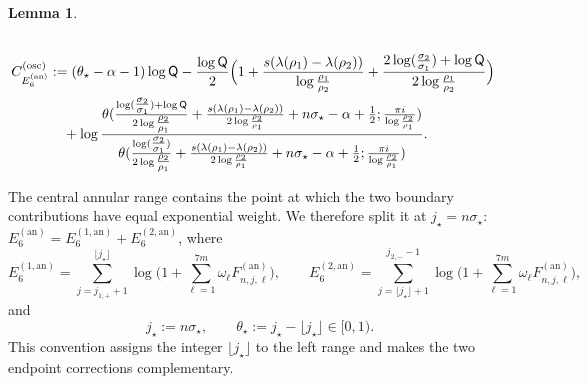 \documentclass[a4paper]{article}
\newtheorem{lemma}[theorem]{Lemma}
\numberwithin{equation}{section}
\begin{document}
\begin{lemma}
\begin{align*}
\\
C_{E_{6}^{(\mathrm{an})}}^{(\mathrm{osc})}    
&:=
(\theta_{\star}-\alpha-1)\log\mathsf{Q}-\frac{\log \mathsf{Q}}{2}\Bigl(1+\frac{s(\lambda(\rho_1)-\lambda(\rho_2))}{\log \frac{\rho_1}{\rho_2}}+\frac{2\log (\tfrac{\sigma_2}{\sigma_1})+\log \mathsf{Q}}{2\log \frac{\rho_1}{\rho_2}}\Bigr)
    \\
    &\quad 
    +\log \frac{\theta( \tfrac{\log (\tfrac{\sigma_2}{\sigma_1})+\log \mathsf{Q}}{2\log \tfrac{\rho_2}{\rho_1}}+\frac{s(\lambda(\rho_1)-\lambda(\rho_2))}{2\log\frac{\rho_2}{\rho_1}}+n\sigma_{\star}-\alpha +\frac{1}{2}; \frac{\pi i }{\log \frac{\rho_2}{\rho_1}})}{\theta( \tfrac{\log (\tfrac{\sigma_2}{\sigma_1})}{2\log \tfrac{\rho_2}{\rho_1}}+\frac{s(\lambda(\rho_1)-\lambda(\rho_2))}{2\log\frac{\rho_2}{\rho_1}}+n\sigma_{\star}-\alpha+\frac{1}{2}; \frac{\pi i }{\log \frac{\rho_2}{\rho_1}})}.
\end{align*}
\end{lemma}

The central annular range contains the point at which the two boundary
contributions have equal exponential weight.  We therefore split it at
$j_\star=n\sigma_\star$:
$E_{6}^{(\mathrm{an})}=E_{6}^{(1,\mathrm{an})}+E_{6}^{(2,\mathrm{an})}$, where
\[
E_{6}^{(1,\mathrm{an})}=\sum_{j=j_{1,+}+1}^{\lfloor j_{\star}\rfloor}\log\Big( 
1+\sum_{\ell=1}^{7m}\omega_{\ell}F_{n,j,\ell}^{(\mathrm{an})}
\Bigr) ,\qquad   
E_{6}^{(2,\mathrm{an})}=\sum_{j=\lfloor j_{\star}\rfloor+1}^{j_{2,-}-1}\log\Big( 
1+\sum_{\ell=1}^{7m}\omega_{\ell}F_{n,j,\ell}^{(\mathrm{an})}
\Bigr),
\]
and
\[
j_{\star}:=n\sigma_{\star},\qquad
\theta_{\star}:=j_{\star}-\lfloor j_{\star}\rfloor\in[0,1).
\]
This convention assigns the integer $\lfloor j_\star\rfloor$ to the left
range and makes the two endpoint corrections complementary.
\end{document}
